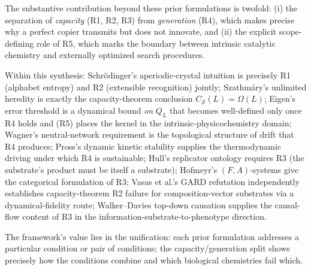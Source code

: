 \documentclass[11pt]{article}
\theoremstyle{plain}
\theoremstyle{definition}
\newcommand{\Csub}{C_{\mathcal{S}}}
\begin{document}
The substantive contribution beyond these prior formulations is twofold: (i) the separation of \emph{capacity} (R1, R2, R3) from \emph{generation} (R4), which makes precise why a perfect copier transmits but does not innovate, and (ii) the explicit scope-defining role of R5, which marks the boundary between intrinsic catalytic chemistry and externally optimized search procedures.

Within this synthesis: Schr\"odinger's aperiodic-crystal intuition is precisely R1 (alphabet entropy) and R2 (extensible recognition) jointly; Szathm\'ary's unlimited heredity is exactly the capacity-theorem conclusion $\Csub(L) = \Omega(L)$; Eigen's error threshold is a dynamical bound \emph{on} $Q_L$ that becomes well-defined only once R4 holds and (R5) places the kernel in the intrinsic-physicochemistry domain; Wagner's neutral-network requirement is the topological structure of drift that R4 produces; Pross's dynamic kinetic stability supplies the thermodynamic driving under which R4 is sustainable; Hull's replicator ontology requires R3 (the substrate's product must be itself a substrate); Hofmeyr's $(F, A)$-systems give the categorical formulation of R3; Vasas et al.'s GARD refutation independently establishes capacity-theorem R2 failure for composition-vector substrates via a dynamical-fidelity route; Walker--Davies top-down causation supplies the causal-flow content of R3 in the information-substrate-to-phenotype direction.

The framework's value lies in the unification: each prior formulation addresses a particular condition or pair of conditions; the capacity/generation split shows precisely how the conditions combine and which biological chemistries fail which.




\end{document}
